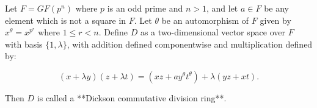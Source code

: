 Let $F = GF(p^n)$ where $p$ is an odd prime and $n > 1$, and let $a \in F$ be any element which is not a square in $F$. Let $\theta$ be an automorphism of $F$ given by $x^{\theta} = x^{p^r}$ where $1 \leq r < n$. Define $D$ as a two-dimensional vector space over $F$ with basis $\{1, \lambda\}$, with addition defined componentwise and multiplication defined by:

$$(x + \lambda y)(z + \lambda t) = (xz + a y^{\theta} t^{\theta}) + \lambda(yz + xt).$$

Then $D$ is called a **Dickson commutative division ring**.
